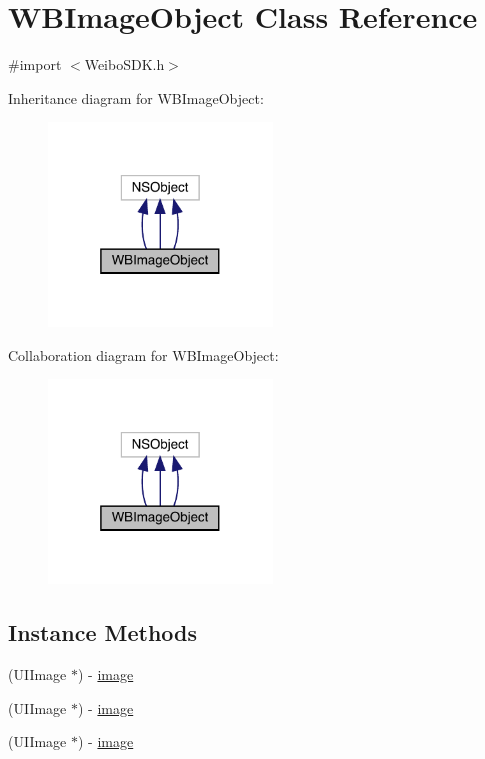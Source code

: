 \hypertarget{interface_w_b_image_object}{}\section{W\+B\+Image\+Object Class Reference}
\label{interface_w_b_image_object}


{\ttfamily \#import $<$Weibo\+S\+D\+K.\+h$>$}



Inheritance diagram for W\+B\+Image\+Object\+:\nopagebreak
\begin{figure}[H]
\begin{center}
\leavevmode
\includegraphics[width=169pt]{interface_w_b_image_object__inherit__graph}
\end{center}
\end{figure}


Collaboration diagram for W\+B\+Image\+Object\+:\nopagebreak
\begin{figure}[H]
\begin{center}
\leavevmode
\includegraphics[width=169pt]{interface_w_b_image_object__coll__graph}
\end{center}
\end{figure}
\subsection*{Instance Methods}
\begin{DoxyCompactItemize}
\item 
(U\+I\+Image $\ast$) -\/ \mbox{\hyperlink{interface_w_b_image_object_a0e4303982ee2db332462c93f48805f2d}{image}}
\item 
(U\+I\+Image $\ast$) -\/ \mbox{\hyperlink{interface_w_b_image_object_a0e4303982ee2db332462c93f48805f2d}{image}}
\item 
(U\+I\+Image $\ast$) -\/ \mbox{\hyperlink{interface_w_b_image_object_a0e4303982ee2db332462c93f48805f2d}{image}}
\end{DoxyCompactItemize}
